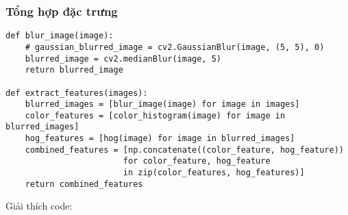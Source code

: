 \documentclass[a4paper,12pt]{article}
\begin{document}
\subsubsection{Tổng hợp đặc trưng}
\label{subsubsec:tong-hop-dac-trung}

\begin{verbatim}
def blur_image(image):
    # gaussian_blurred_image = cv2.GaussianBlur(image, (5, 5), 0)
    blurred_image = cv2.medianBlur(image, 5)
    return blurred_image

def extract_features(images):
    blurred_images = [blur_image(image) for image in images]
    color_features = [color_histogram(image) for image in blurred_images]
    hog_features = [hog(image) for image in blurred_images]
    combined_features = [np.concatenate((color_feature, hog_feature)) 
                        for color_feature, hog_feature 
                        in zip(color_features, hog_features)]
    return combined_features
\end{verbatim}

\noindent Giải thích code:
\end{document}
